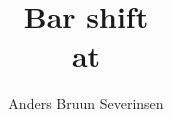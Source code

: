 

\title{Bar shift\\ at \fredagscafeen}
\date{}
\author{Anders Bruun Severinsen}


\maketitle

\tableofcontents











\printindex


